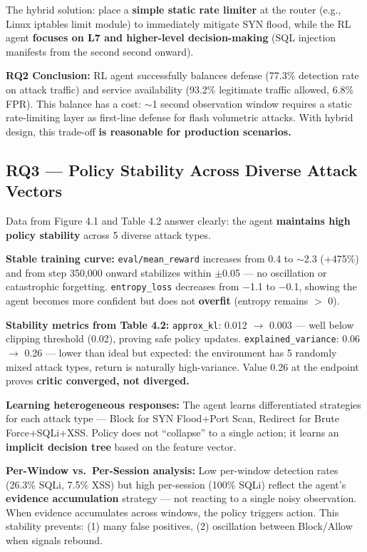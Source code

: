\documentclass[12pt,a4paper]{report}
\begin{document}
The hybrid solution: place a \textbf{simple static rate limiter} at the router (e.g., Linux iptables limit module) to immediately mitigate SYN flood, while the RL agent \textbf{focuses on L7 and higher-level decision-making} (SQL injection manifests from the second second onward).

\textbf{RQ2 Conclusion:} RL agent successfully balances defense (77.3\% detection rate on attack traffic) and service availability (93.2\% legitimate traffic allowed, 6.8\% FPR). This balance has a cost: $\sim$1 second observation window requires a static rate-limiting layer as first-line defense for flash volumetric attacks. With hybrid design, this trade-off \textbf{is reasonable for production scenarios.}

\subsection{RQ3 --- Policy Stability Across Diverse Attack Vectors}

Data from Figure 4.1 and Table 4.2 answer clearly: the agent \textbf{maintains high policy stability} across 5 diverse attack types.

\textbf{Stable training curve:} \texttt{eval/mean\_reward} increases from 0.4 to $\sim$2.3 (+475\%) and from step 350,000 onward stabilizes within $\pm$0.05 --- no oscillation or catastrophic forgetting. \texttt{entropy\_loss} decreases from $-$1.1 to $-$0.1, showing the agent becomes more confident but does not \textbf{overfit} (entropy remains $>$ 0).

\textbf{Stability metrics from Table 4.2:} \texttt{approx\_kl}: 0.012 $\to$ 0.003 --- well below clipping threshold (0.02), proving safe policy updates. \texttt{explained\_variance}: 0.06 $\to$ 0.26 --- lower than ideal but expected: the environment has 5 randomly mixed attack types, return is naturally high-variance. Value 0.26 at the endpoint proves \textbf{critic converged, not diverged.}

\textbf{Learning heterogeneous responses:} The agent learns differentiated strategies for each attack type --- Block for SYN Flood+Port Scan, Redirect for Brute Force+SQLi+XSS. Policy does not ``collapse'' to a single action; it learns an \textbf{implicit decision tree} based on the feature vector.

\textbf{Per-Window vs.\ Per-Session analysis:} Low per-window detection rates (26.3\% SQLi, 7.5\% XSS) but high per-session (100\% SQLi) reflect the agent's \textbf{evidence accumulation} strategy --- not reacting to a single noisy observation. When evidence accumulates across windows, the policy triggers action. This stability prevents: (1) many false positives, (2) oscillation between Block/Allow when signals rebound.
\end{document}
